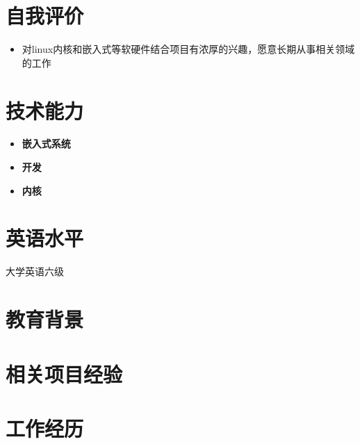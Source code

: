 \documentclass{resume}
\begin{document}



\section{自我评价}
\begin{itemize}
  
  \item 对linux内核和嵌入式等软硬件结合项目有浓厚的兴趣，愿意长期从事相关领域的工作
\end{itemize}

\section{技术能力}
\begin{itemize}[parsep=0.2ex]
  \item \textbf{嵌入式系统}
    \begin{itemize}
      
    \end{itemize}
  \item \textbf{开发}
    \begin{itemize}
      
    \end{itemize}
  \item \textbf{内核}
    \begin{itemize}
      
    \end{itemize}
\end{itemize}

\section{英语水平}
大学英语六级

\section{教育背景}

\vspace{4mm}

\section{相关项目经验}
\begin{itemize}[parsep=0.2ex]
  
\end{itemize}

\section{工作经历}

\end{document}
